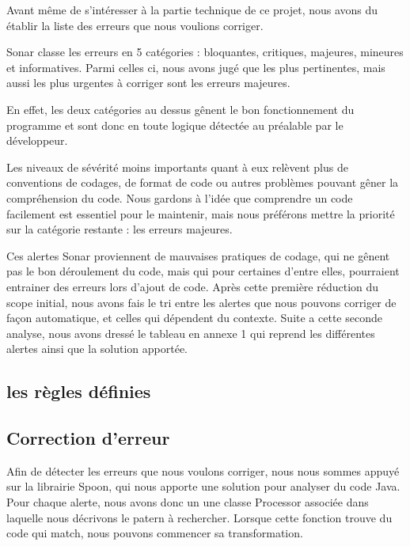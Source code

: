 \documentclass[a4paper]{article}
\begin{document}
\par Avant même de s'intéresser à la partie technique de ce projet, nous avons du établir la liste des erreurs que nous voulions corriger.
\\
\par Sonar classe les erreurs en 5 catégories : bloquantes, critiques, majeures, mineures et informatives. Parmi celles ci, nous avons jugé que les plus pertinentes, mais aussi les plus urgentes à corriger sont les erreurs majeures.
\\
\par En effet, les deux catégories au dessus gênent le bon fonctionnement du programme et sont donc en toute logique détectée au préalable par le développeur.
\\
\par Les niveaux de sévérité moins importants quant à eux relèvent plus de conventions de codages, de format de code ou autres problèmes pouvant gêner la compréhension du code. Nous gardons à l'idée que comprendre un code facilement est essentiel pour le maintenir, mais nous préférons mettre la priorité sur la catégorie restante : les erreurs majeures.
\\
\par Ces alertes Sonar proviennent de mauvaises pratiques de codage, qui ne gênent pas le bon déroulement du code, mais qui pour certaines d'entre elles, pourraient entrainer des erreurs lors d'ajout de code. Après cette première réduction du scope initial, nous avons fais le tri entre les alertes que nous pouvons corriger de façon automatique, et celles qui dépendent du contexte. Suite a cette seconde analyse, nous avons dressé le tableau en annexe 1 qui reprend les différentes alertes ainsi que la solution apportée.

\subsection{les règles définies}

\subsection{Correction d'erreur}
\par Afin de détecter les erreurs que nous voulons corriger, nous nous sommes appuyé sur la librairie Spoon, qui nous apporte une solution pour analyser du code Java. Pour chaque alerte, nous avons donc un une classe Processor associée dans laquelle nous décrivons le patern à rechercher. Lorsque cette fonction trouve du code qui match, nous pouvons commencer sa transformation.
\end{document}

